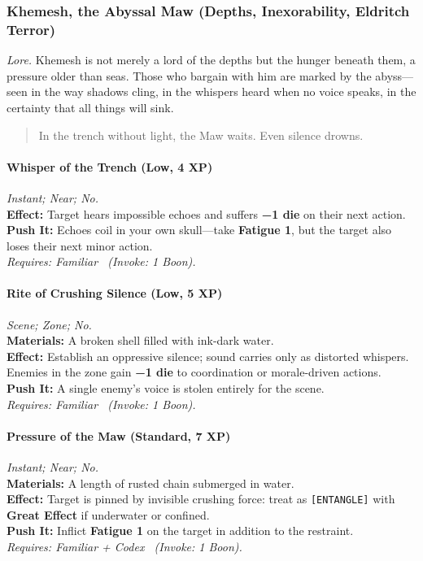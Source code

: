 
\subsubsection{Khemesh, the Abyssal Maw (Depths, Inexorability, Eldritch Terror)}
\textit{Lore.} Khemesh is not merely a lord of the depths but the hunger beneath them, a pressure older than seas. Those who bargain with him are marked by the abyss—seen in the way shadows cling, in the whispers heard when no voice speaks, in the certainty that all things will sink.

\begin{quote}
In the trench without light, the Maw waits. Even silence drowns.
\end{quote}

\paragraph{Whisper of the Trench (Low, 4 XP)} \emph{Instant; Near; No.}\\
\textbf{Effect:} Target hears impossible echoes and suffers \textbf{−1 die} on their next action.\\
\textbf{Push It:} Echoes coil in your own skull—take \textbf{Fatigue 1}, but the target also loses their next minor action.\\
\emph{Requires: Familiar \ (\textit{Invoke:} 1 Boon).}

\paragraph{Rite of Crushing Silence (Low, 5 XP)} \emph{Scene; Zone; No.}\\
\textbf{Materials:} A broken shell filled with ink-dark water.\\
\textbf{Effect:} Establish an oppressive silence; sound carries only as distorted whispers. Enemies in the zone gain \textbf{−1 die} to coordination or morale-driven actions.\\
\textbf{Push It:} A single enemy’s voice is stolen entirely for the scene.\\
\emph{Requires: Familiar \ (\textit{Invoke:} 1 Boon).}

\paragraph{Pressure of the Maw (Standard, 7 XP)} \emph{Instant; Near; No.}\\
\textbf{Materials:} A length of rusted chain submerged in water.\\
\textbf{Effect:} Target is pinned by invisible crushing force: treat as \texttt{[ENTANGLE]} with \textbf{Great Effect} if underwater or confined.\\
\textbf{Push It:} Inflict \textbf{Fatigue 1} on the target in addition to the restraint.\\
\emph{Requires: Familiar + Codex \ (\textit{Invoke:} 1 Boon).}

